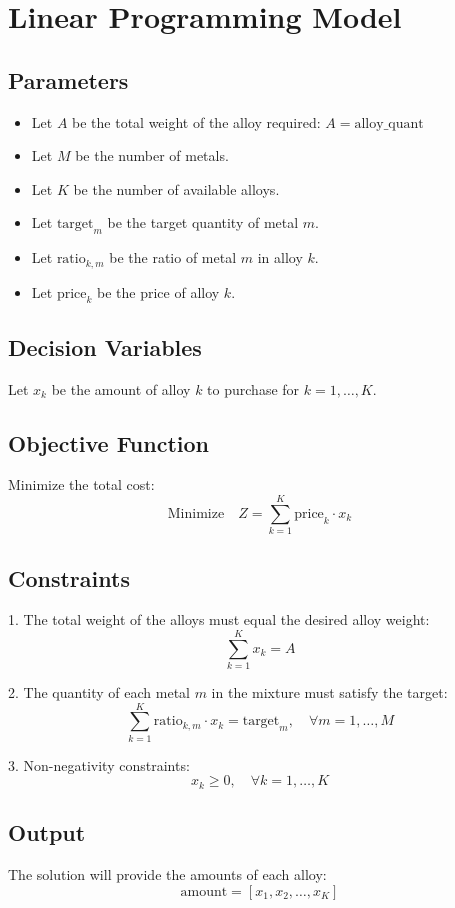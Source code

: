 \documentclass{article}
\begin{document}
\section*{Linear Programming Model}

\subsection*{Parameters}
\begin{itemize}
    \item Let \( A \) be the total weight of the alloy required: \( A = \text{alloy\_quant} \)
    \item Let \( M \) be the number of metals.
    \item Let \( K \) be the number of available alloys.
    \item Let \( \text{target}_{m} \) be the target quantity of metal \( m \).
    \item Let \( \text{ratio}_{k, m} \) be the ratio of metal \( m \) in alloy \( k \).
    \item Let \( \text{price}_{k} \) be the price of alloy \( k \).
\end{itemize}

\subsection*{Decision Variables}
Let \( x_k \) be the amount of alloy \( k \) to purchase for \( k = 1, \ldots, K \).

\subsection*{Objective Function}
Minimize the total cost:
\[
\text{Minimize} \quad Z = \sum_{k=1}^{K} \text{price}_{k} \cdot x_k
\]

\subsection*{Constraints}
1. The total weight of the alloys must equal the desired alloy weight:
\[
\sum_{k=1}^{K} x_k = A
\]

2. The quantity of each metal \( m \) in the mixture must satisfy the target:
\[
\sum_{k=1}^{K} \text{ratio}_{k,m} \cdot x_k = \text{target}_{m}, \quad \forall m = 1, \ldots, M
\]

3. Non-negativity constraints:
\[
x_k \geq 0, \quad \forall k = 1, \ldots, K
\]

\subsection*{Output}
The solution will provide the amounts of each alloy:
\[
\text{amount} = [x_1, x_2, \ldots, x_K]
\]
\end{document}
